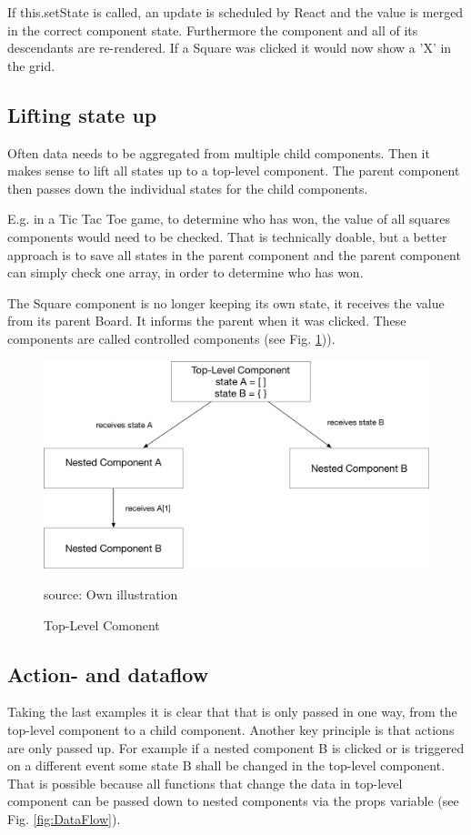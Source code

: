 If this.setState is called, an update is scheduled by React and the value is merged in the correct component state. Furthermore the component and all of its descendants are re-rendered. If a Square was clicked it would now show a 'X' in the grid.

\subsection{Lifting state up}
Often data needs to be aggregated from multiple child components. Then it makes sense to lift all states up to a top-level component. The parent component then passes down the individual states for the child components.

E.g. in a Tic Tac Toe game, to determine who has won, the value of all squares components would need to be checked. That is technically doable, but a better approach is to save all states in the parent component and the parent component can simply check one array, in order to determine who has won. 

The Square component is no longer keeping its own state, it receives the value from its parent Board. It informs the parent when it was clicked. These components are called controlled components  (see Fig. \ref{fig:TopLevel})).

\begin{figure}[H]
	\centering
	\includegraphics[width=0.8\linewidth]{bilder/grundlagen/topLevelComponent.png}
	\caption{Top-Level Comonent} source: Own illustration
	\label{fig:TopLevel}
\end{figure}


\subsection{Action- and dataflow}
Taking the last examples it is clear that that is only passed in one way, from the top-level component to a child component. Another key principle is that actions are only passed up. For example if a nested component B is clicked or is triggered on a different event some state B shall be changed in the top-level component. That is possible because all functions that change the data in top-level component can be passed down to nested components via the props variable (see Fig. \ref{fig:DataFlow}).

